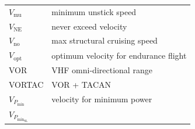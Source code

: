 \documentclass[
]{book}
\begin{document}
\begin{longtable}[]{@{}ll@{}}
\begin{minipage}[t]{0.47\columnwidth}
\(V_{\mathrm{mu}}\)\strut
\end{minipage} & \begin{minipage}[t]{0.47\columnwidth}\raggedright
minimum unstick speed\strut
\end{minipage}\tabularnewline
\begin{minipage}[t]{0.47\columnwidth}\raggedright
\(V_{\mathrm{NE}}\)\strut
\end{minipage} & \begin{minipage}[t]{0.47\columnwidth}\raggedright
never exceed velocity\strut
\end{minipage}\tabularnewline
\begin{minipage}[t]{0.47\columnwidth}\raggedright
\(V_{\mathrm{no}}\)\strut
\end{minipage} & \begin{minipage}[t]{0.47\columnwidth}\raggedright
max structural cruising speed\strut
\end{minipage}\tabularnewline
\begin{minipage}[t]{0.47\columnwidth}\raggedright
\(V_{\mathrm{opt}}\)\strut
\end{minipage} & \begin{minipage}[t]{0.47\columnwidth}\raggedright
optimum velocity for endurance flight\strut
\end{minipage}\tabularnewline
\begin{minipage}[t]{0.47\columnwidth}\raggedright
VOR\strut
\end{minipage} & \begin{minipage}[t]{0.47\columnwidth}\raggedright
VHF omni-directional range\strut
\end{minipage}\tabularnewline
\begin{minipage}[t]{0.47\columnwidth}\raggedright
VORTAC\strut
\end{minipage} & \begin{minipage}[t]{0.47\columnwidth}\raggedright
VOR + TACAN\strut
\end{minipage}\tabularnewline
\begin{minipage}[t]{0.47\columnwidth}\raggedright
\(V_{P_{\mathrm{min}}}\)\strut
\end{minipage} & \begin{minipage}[t]{0.47\columnwidth}\raggedright
velocity for minimum power\strut
\end{minipage}\tabularnewline
\begin{minipage}[t]{0.47\columnwidth}\raggedright
\(V_{P_{\mathrm{min}_{\mathrm{SL}}}}\)\strut
\end{minipage} & \begin{minipage}[t]{0.47\columnwidth}\raggedright

\end{minipage}
\end{longtable}
\end{document}
